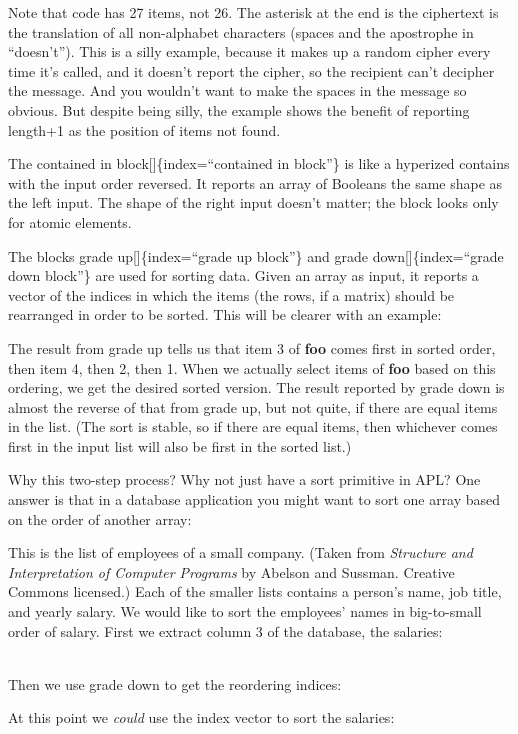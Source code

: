\documentclass[
  letterpaper,
]{book}
\begin{document}
Note that code has 27 items, not 26. The asterisk at the end is the
ciphertext is the translation of all non-alphabet characters (spaces and
the apostrophe in ``doesn't''). This is a silly example, because it
makes up a random cipher every time it's called, and it doesn't report
the cipher, so the recipient can't decipher the message. And you
wouldn't want to make the spaces in the message so obvious. But despite
being silly, the example shows the benefit of reporting length+1 as the
position of items not found.

The contained in block{[}{]}\{index=``contained in block''\} is like a
hyperized contains with the input order reversed. It reports an array of
Booleans the same shape as the left input. The shape of the right input
doesn't matter; the block looks only for atomic elements.

The blocks grade up{[}{]}\{index=``grade up block''\} and grade
down{[}{]}\{index=``grade down block''\} are used for sorting data.
Given an array as input, it reports a vector of the indices in which the
items (the rows, if a matrix) should be rearranged in order to be
sorted. This will be clearer with an example:

The result from grade up tells us that item 3 of \textbf{foo} comes
first in sorted order, then item 4, then 2, then 1. When we actually
select items of \textbf{foo} based on this ordering, we get the desired
sorted version. The result reported by grade down is almost the reverse
of that from grade up, but not quite, if there are equal items in the
list. (The sort is stable, so if there are equal items, then whichever
comes first in the input list will also be first in the sorted list.)

Why this two-step process? Why not just have a sort primitive in APL?
One answer is that in a database application you might want to sort one
array based on the order of another array:

This is the list of employees of a small company. (Taken from
\emph{Structure and Interpretation of Computer Programs} by Abelson and
Sussman. Creative Commons licensed.) Each of the smaller lists contains
a person's name, job title, and yearly salary. We would like to sort the
employees' names in big-to-small order of salary. First we extract
column 3 of the database, the salaries:

\strut \\
Then we use grade down to get the reordering indices:

At this point we \emph{could} use the index vector to sort the salaries:
\end{document}
